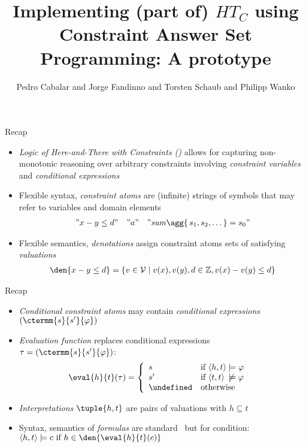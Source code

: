 \documentclass[11pt]{beamer}
\author[Cabalar et al.]{Pedro Cabalar and Jorge Fandinno and Torsten Schaub and Philipp Wanko}
\title[Implementing $\mathit{HT}_C$ using CASP]{Implementing (part of) $\mathit{HT}_C$ using Constraint Answer Set Programming: A prototype}
\date{}
\begin{document}



\begin{frame}
\titlepage
\end{frame}

\begin{frame}{Recap}
\begin{itemize}
\item \emph{Logic of Here-and-There with Constraints (\HTC)} allows for capturing non-monotonic reasoning over arbitrary constraints involving \emph{constraint variables} and \emph{conditional expressions}
\pause
\item Flexible syntax, \emph{constraint atoms} are (infinite) strings of symbols that may refer to variables and domain elements
\begin{align*}
"x-y\leq d"\quad"a"\quad"\mathit{sum}\agg{ \, s_1, s_2, \dots \,  } = s_0"
\end{align*}
\vspace*{-.5cm}
\pause
\item Flexible semantics, \emph{denotations} assign constraint atoms sets of satisfying \emph{valuations}
\begin{align*}
  \den{x-y\leq d}
  =
  \{v\in\mathcal{V}\mid v(x),v(y), d\in \mathbb{Z}, v(x)-v(y)\leq d\}
\end{align*}
\end{itemize}
\end{frame}

\begin{frame}{Recap}
\begin{itemize}
\item \emph{Conditional constraint atoms} may contain \emph{conditional expressions} $(\ctermm{s}{s'}{\varphi})$
\pause
\item \emph{Evaluation function} replaces conditional expressions $\tau=(\ctermm{s}{s'}{\varphi})$:
  \begin{align*}
    \eval{h}{t}(\tau)
    &=
      \left\{
      \begin{array}{ll}
        s & \text{if } \langle h,t\rangle\models\varphi\\
        s' & \text{if } \langle t,t\rangle \hspace{2pt}\not\models\varphi\\
        \undefined & \text{otherwise}
      \end{array}
      \right.
  \end{align*}
\vspace*{-.5cm}
\pause
\item \emph{Interpretations} $\tuple{h,t}$ are pairs of valuations with $h\subseteq t$
\pause
\item Syntax, semantics of \emph{formulas} are standard \HT\ but for condition:
$\langle h,t \rangle \models c \text{ if } h\in \den{\eval{h}{t}(c)}$
\end{itemize}
\end{frame}
\end{document}
